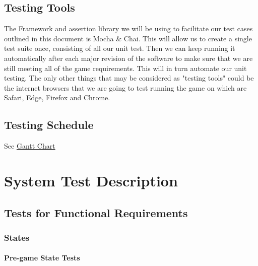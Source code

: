 \documentclass[12pt, titlepage]{article}
\begin{document}
\subsection{Testing Tools}
The Framework and assertion library we will be using to facilitate our test cases outlined in this document is Mocha & Chai. This will allow us to create a single test suite once, consisting of all our unit test. Then we can keep running it automatically after each major revision of the software to make sure that we are still meeting all of the game requirements. This will in turn automate our unit testing. The only other things that may be considered as "testing tools" could be the internet browsers that we are going to test running the game on which are Safari, Edge, Firefox and Chrome.

\subsection{Testing Schedule}

See \href{https://gitlab.cas.mcmaster.ca/nagyj2/Staroids/tree/master/ProjectSchedule/StaroidsGantt.pdf}{Gantt Chart}

\section{System Test Description}

\subsection{Tests for Functional Requirements}

\subsubsection{States}

\paragraph{Pre-game State Tests}
\end{document}
